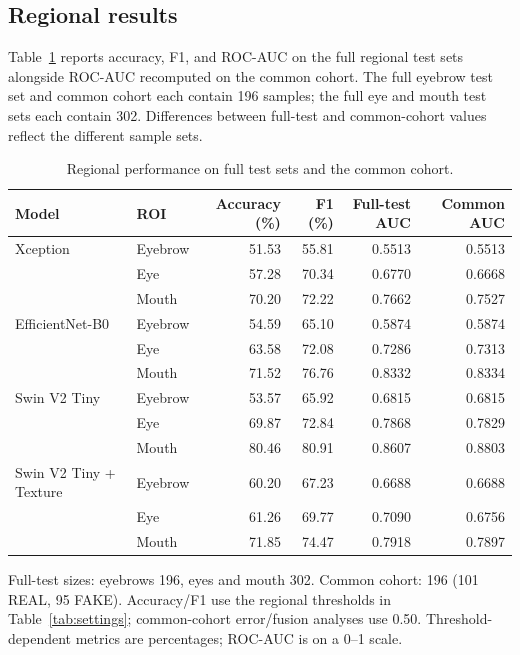 \documentclass[a4paper]{elektr}
\begin{document}
\subsection{Regional results}
Table~\ref{tab:regional} reports accuracy, F1, and ROC-AUC on the full regional test sets alongside ROC-AUC recomputed on the common cohort. The full eyebrow test set and common cohort each contain 196 samples; the full eye and mouth test sets each contain 302. Differences between full-test and common-cohort values reflect the different sample sets.
\begin{table}[!htbp]\centering\begin{minipage}{15.8cm}
\caption{Regional performance on full test sets and the common cohort.}\label{tab:regional}
\centering \small
\begin{tabular}{llrrrr}\toprule
Model & ROI & Accuracy (\%) & F1 (\%) & Full-test AUC & Common AUC \\\midrule
Xception & Eyebrow & 51.53 & 55.81 & 0.5513 & 0.5513 \\
 & Eye & 57.28 & 70.34 & 0.6770 & 0.6668 \\
 & Mouth & 70.20 & 72.22 & 0.7662 & 0.7527 \\
EfficientNet-B0 & Eyebrow & 54.59 & 65.10 & 0.5874 & 0.5874 \\
 & Eye & 63.58 & 72.08 & 0.7286 & 0.7313 \\
 & Mouth & 71.52 & 76.76 & 0.8332 & 0.8334 \\
Swin V2 Tiny & Eyebrow & 53.57 & 65.92 & 0.6815 & 0.6815 \\
 & Eye & 69.87 & 72.84 & 0.7868 & 0.7829 \\
 & Mouth & 80.46 & 80.91 & 0.8607 & 0.8803 \\
Swin V2 Tiny + Texture & Eyebrow & 60.20 & 67.23 & 0.6688 & 0.6688 \\
 & Eye & 61.26 & 69.77 & 0.7090 & 0.6756 \\
 & Mouth & 71.85 & 74.47 & 0.7918 & 0.7897 \\
\bottomrule\end{tabular}
\par\smallskip\begin{minipage}{\linewidth}\small Full-test sizes: eyebrows 196, eyes and mouth 302. Common cohort: 196 (101 REAL, 95 FAKE). Accuracy/F1 use the regional thresholds in Table~\ref{tab:settings}; common-cohort error/fusion analyses use 0.50. Threshold-dependent metrics are percentages; ROC-AUC is on a 0--1 scale.\end{minipage}
\end{minipage}\end{table}
\end{document}
